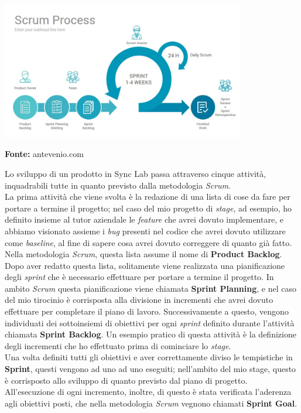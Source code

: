 \begin{minipage}{\linewidth}
  \centering
    \includegraphics[height=6cm]{immagini/scrum}
  \caption*{\textbf{Fonte:} antevenio.com}
\end{minipage}

Lo sviluppo di un prodotto in Sync Lab passa attraverso cinque attività, inquadrabili tutte in quanto previsto dalla metodologia \textit{Scrum}. \\
La prima attività che viene svolta è la redazione di una lista di cose da fare per portare a termine il progetto; nel caso del mio progetto di \textit{stage}, ad esempio, ho definito insieme al tutor aziendale le \textit{feature} che avrei dovuto implementare, e abbiamo visionato assieme i \textit{bug} presenti nel codice che avrei dovuto utilizzare come \textit{baseline}, al fine di sapere cosa avrei dovuto correggere di quanto già fatto. Nella metodologia \textit{Scrum}, questa lista assume il nome di \textbf{Product Backlog}. \\
Dopo aver redatto questa lista, solitamente viene realizzata una pianificazione degli \textit{sprint} che è necessario effettuare per portare a termine il progetto. In ambito \textit{Scrum} questa pianificazione viene chiamata \textbf{Sprint Planning}, e nel caso del mio tirocinio è corrisposta alla divisione in incrementi che avrei dovuto effettuare per completare il piano di lavoro. Successivamente a questo, vengono individuati dei sottoinsiemi di obiettivi per ogni \textit{sprint} definito durante l'attività chiamata \textbf{Sprint Backlog}. Un esempio pratico di questa attività è la definizione degli incrementi che ho effettuato prima di cominciare lo \textit{stage}. \\
Una volta definiti tutti gli obiettivi e aver correttamente diviso le tempistiche in \textbf{Sprint}, questi vengono ad uno ad uno eseguiti; nell'ambito del mio stage, questo è corrisposto allo sviluppo di quanto previsto dal piano di progetto. All'esecuzione di ogni incremento, inoltre, di questo è stata verificata l'aderenza agli obiettivi posti, che nella metodologia \textit{Scrum} vegnono chiamati \textbf{Sprint Goal}.

